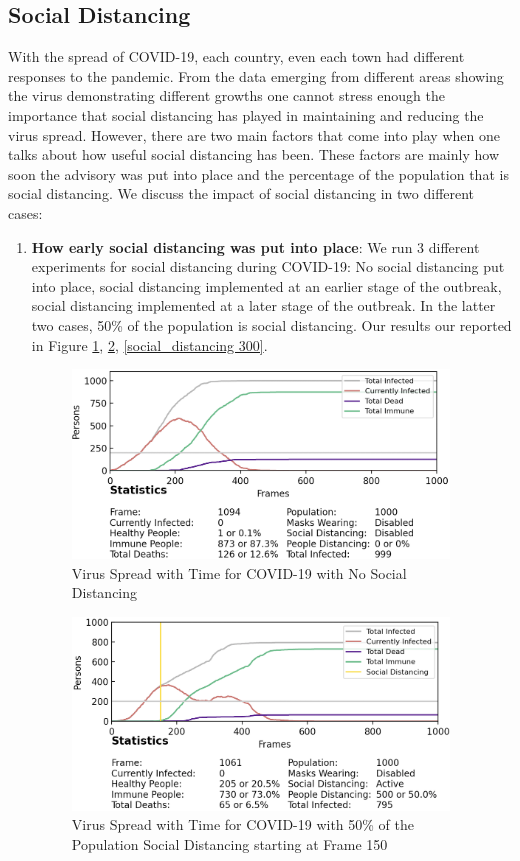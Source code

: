 \documentclass[11pt]{article}
\begin{document}
\subsection{Social Distancing} 
With the spread of COVID-19, each country, even each town had different responses to the pandemic. From the data emerging from different areas showing the virus demonstrating different growths
one cannot stress enough the importance that social distancing has played in maintaining and reducing the virus spread. However, there are two main factors that come into play when one talks about how useful social distancing has been. These factors are mainly how soon the advisory was put into place and the percentage of the population that is social distancing\cite{social_distancing}. We discuss the impact of social distancing in two different cases: 
\begin{enumerate}
    \item \textbf{How early social distancing was put into place}: We run 3 different experiments for social distancing during COVID-19: No social distancing put into place, social distancing implemented at an earlier stage of the outbreak, social distancing implemented at a later stage of the outbreak. In the latter two cases, 50\% of the population is social distancing. Our results our reported in Figure \ref{no_social_distancing}, \ref{social_distancing_150}, \ref{social_distancing 300}.
    \begin{figure}[H]
    \centering
    \includegraphics[width=10cm]{figures/no_social_distancing.png}
    \caption{Virus Spread with Time for COVID-19 with No Social Distancing}
    \label{no_social_distancing}
\end{figure}

\begin{figure}[H]
    \centering
    \includegraphics[width=10cm]{figures/social_distancing_150.png}
    \caption{Virus Spread with Time for COVID-19 with 50\% of the Population Social Distancing starting at Frame 150}
    \label{social_distancing_150}
\end{figure}


\end{enumerate}
\end{document}
